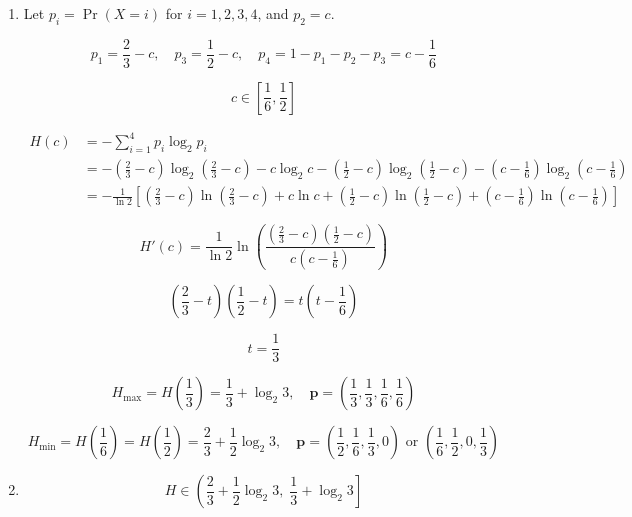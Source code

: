 \documentclass[a4paper]{article}
\begin{document}
\begin{enumerate}
    \item[(a)]
    
    Let $p_i = \Pr(X = i)$ for $i = 1, 2, 3, 4$, and $p_2 = c$.

    $$
    p_1 = \frac{2}{3} - c, \quad p_3 = \frac{1}{2} - c, \quad p_4 = 1 - p_1 - p_2 - p_3 = c - \frac{1}{6}
    $$

    $$
    c \in \left[\frac{1}{6}, \frac{1}{2}\right]
    $$

    $$
    \begin{aligned}
    H(c)
    &= -\sum_{i=1}^4 p_i \log_2 p_i \\
    &= -\left(\frac{2}{3} - c\right) \log_2 \left(\frac{2}{3} - c\right) - c \log_2 c - \left(\frac{1}{2} - c\right) \log_2 \left(\frac{1}{2} - c\right) - \left(c - \frac{1}{6}\right) \log_2 \left(c - \frac{1}{6}\right) \\
    &= -\frac{1}{\ln 2} \left[ \left(\frac{2}{3} - c\right) \ln \left(\frac{2}{3} - c\right) + c \ln c + \left(\frac{1}{2} - c\right) \ln \left(\frac{1}{2} - c\right) + \left(c - \frac{1}{6}\right) \ln \left(c - \frac{1}{6}\right) \right]
    \end{aligned}
    $$

    $$
    H'(c) = \frac{1}{\ln 2} \ln \left( \frac{\left(\frac{2}{3}-c\right)\left(\frac{1}{2}-c\right)}{c\left(c-\frac{1}{6}\right)} \right)
    $$

    $$
    \left(\frac{2}{3}-t\right)\left(\frac{1}{2}-t\right) = t\left(t-\frac{1}{6}\right)
    $$

    $$
    t = \frac{1}{3}
    $$

    $$
    H_{\max} = H\left(\frac{1}{3}\right) = \frac{1}{3} + \log_2 3, \quad \mathbf{p} = \left(\frac{1}{3}, \frac{1}{3}, \frac{1}{6}, \frac{1}{6}\right)
    $$
    
    $$
    H_{\min} = H\left(\frac{1}{6}\right) = H\left(\frac{1}{2}\right) = \frac{2}{3} + \frac{1}{2} \log_2 3
    ,\quad
    \mathbf{p} = \left(\frac{1}{2}, \frac{1}{6}, \frac{1}{3}, 0\right) \text{ or } \left(\frac{1}{6}, \frac{1}{2}, 0, \frac{1}{3}\right)
    $$

    \item[(b)]
    
    $$
    H \in \left(\frac{2}{3} + \frac{1}{2}\log_2 3, \; \frac{1}{3} + \log_2 3\right]
    $$
\end{enumerate}
\end{document}
